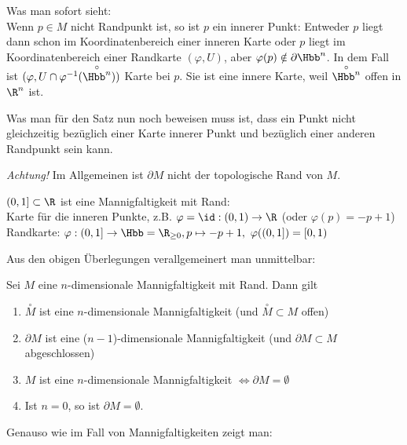 \begin{rem*}
	Was man sofort sieht:\\
	Wenn $p \in M$ nicht Randpunkt ist, so ist $p$ ein innerer Punkt: Entweder $p$ liegt dann schon im Koordinatenbereich einer inneren Karte oder $p$ liegt im Koordinatenbereich einer Randkarte $(\varphi,U)$, aber $\varphi(p) \notin \partial\Hbb^n$. In dem Fall ist \( (\varphi, U \cap \varphi^{-1}(\overset{\circ}{\Hbb^n})) \) Karte bei $p$. Sie ist eine innere Karte, weil $\overset{\circ}{\Hbb^n}$ offen in $\R^n$ ist.
\end{rem*}

Was man für den Satz nun noch beweisen muss ist, dass ein Punkt nicht gleichzeitig bezüglich einer Karte innerer Punkt und bezüglich einer anderen Randpunkt sein kann.

\begin{rem*}
	\emph{Achtung!} Im Allgemeinen ist $\partial M$ nicht der topologische Rand von $M$.
\end{rem*}

\begin{exmp*}
	\( (0,1] \subset \R \) ist eine Mannigfaltigkeit mit Rand:\\
	Karte für die inneren Punkte, z.B. \( \varphi = \id: (0,1) \to \R \) (oder \( \varphi(p) = -p+1 \))\\
	Randkarte: \( \varphi: (0,1] \to \Hbb = \R_{\geq 0}, p \mapsto -p+1,\ \varphi((0,1]) = [0,1) \)
\end{exmp*}

Aus den obigen Überlegungen verallgemeinert man unmittelbar:

\begin{lem}\autolabel
	Sei $M$ eine $n$-dimensionale Mannigfaltigkeit mit Rand. Dann gilt
	\begin{enumerate}[label={\roman*})]
		\item $\overset{\circ}{M}$ ist eine $n$-dimensionale Mannigfaltigkeit (und $\overset{\circ}{M} \subset M$ offen)
		\item $\partial M$ ist eine ($n-1$)-dimensionale Mannigfaltigkeit (und $\partial M \subset M$ abgeschlossen)
		\item $M$ ist eine $n$-dimensionale Mannigfaltigkeit $\iff  \partial M = \emptyset$
		\item Ist $n=0$, so ist $\partial M = \emptyset$.
	\end{enumerate}
\end{lem}

Genauso wie im Fall von Mannigfaltigkeiten zeigt man:

